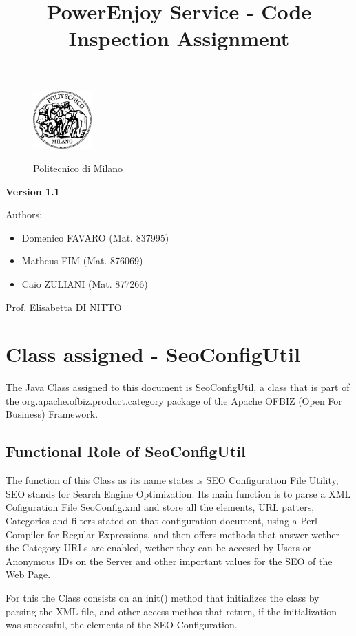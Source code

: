 \documentclass[a4paper]{article}
\title{PowerEnjoy Service - Code Inspection Assignment}
\begin{document}
\begin{titlepage}
\begin{figure}
\centering
\includegraphics[width=0.2\textwidth]{polimi.jpg}
\par
\LARGE Politecnico di Milano
\end{figure}


\maketitle
\textbf{Version 1.1}
\newline

\raggedright
Authors:
\begin{itemize}
	\item Domenico FAVARO (Mat. 837995)
        	\item Matheus FIM (Mat. 876069)
	\item Caio ZULIANI (Mat. 877266)	
\end{itemize}
\raggedleft
Prof. Elisabetta DI NITTO
\thispagestyle{empty}
\end{titlepage}

\tableofcontents
\newpage
 
\section{Class assigned - SeoConfigUtil}

The Java Class assigned to this document is \ttfamily SeoConfigUtil\rmfamily, a class that is part of the \ttfamily org.apache.ofbiz.product.category \rmfamily package of the Apache OFBIZ (Open For Business) Framework. 

\subsection{Functional Role of SeoConfigUtil}

The function of this Class as its name states is SEO Configuration File Utility, SEO stands for Search Engine Optimization. Its main function is to parse a XML Cofiguration File \ttfamily SeoConfig.xml \rmfamily and store all the elements, URL patters, Categories and filters stated on that configuration document, using a Perl Compiler for Regular Expressions, and then offers methods that answer wether the Category URLs are enabled, wether they can be accesed by Users or Anonymous IDs on the Server and other important values for the SEO of the Web Page.\newline 
\par
For this the Class consists on an \ttfamily init() \rmfamily method that initializes the class by parsing the XML file, and other access methos that return, if the initialization was successful, the elements of the SEO Configuration.
\end{document}
